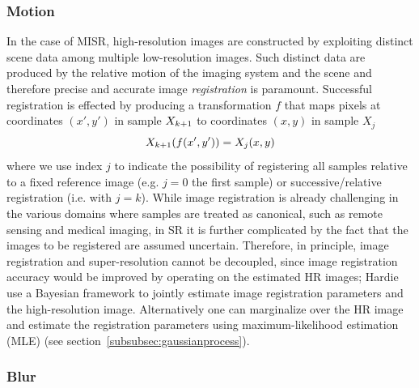 \subsubsection{Motion}

In the case of MISR, high-resolution images are constructed by exploiting distinct scene data among multiple low-resolution images.
%
Such distinct data are produced by the relative motion of the imaging system and the scene and therefore precise and accurate image \textit{registration} is paramount.
%
Successful registration is effected by producing a transformation $f$ that maps pixels at coordinates $(x',y')$ in sample $X_{k+1}$ to coordinates $(x,y)$ in sample $X_j$
\begin{equation}
	X_{k+1}(f(x', y')) = X_j(x,y)
	\label{eqn:registration}
\end{equation}
where we use index $j$ to indicate the possibility of registering all samples relative to a fixed reference image (e.g. $j=0$ the first sample) or successive/relative registration (i.e. with $j=k$).
%
While image registration is already challenging in the various domains where samples are treated as canonical, such as remote sensing and medical imaging, in SR it is further complicated by the fact that the images to be registered are assumed uncertain.
%
Therefore, in principle, image registration and super-resolution cannot be decoupled, since image registration accuracy would be improved by operating on the estimated HR images;
%
Hardie \etal~\cite{Hardie1997} use a Bayesian framework to jointly estimate image registration parameters and the high-resolution image\cite{Hardie1997}.
%
Alternatively one can marginalize over the HR image and estimate the registration parameters using maximum-likelihood estimation (MLE) (see section~\ref{subsubsec:gaussianprocess}).

\subsubsection{Blur}

